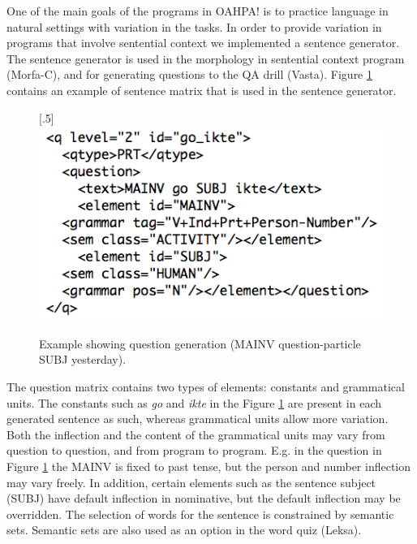 \documentclass[11pt]{article}
\begin{document}
One of the main goals of the programs in OAHPA! is to practice language in natural settings with variation in the tasks. In order to provide variation in programs that involve sentential context we implemented a sentence generator. The sentence generator is used in the morphology in sentential context program (Morfa-C), and for generating questions to the QA drill (Vasta). Figure \ref{questionv} contains an example of sentence matrix that is used in the sentence generator.

\begin{figure}[htbp]
\begin{center}
\scalebox{.5}[.5]{\includegraphics{presentation/img/question_vasta2.png}}\\
\caption{Example showing question generation (MAINV question-particle SUBJ yesterday).}
\label{questionv}
\end{center}
\end{figure}

The question matrix contains two types of elements: constants and grammatical units. The constants such as \textit{go} and \textit{ikte} in the Figure \ref{questionv} are present in each generated sentence as such, whereas grammatical units allow more variation. Both the inflection and the content of the grammatical units may vary from question to question, and from program to program. E.g. in the question in Figure \ref{questionv} the MAINV is fixed to past tense, but the person and number inflection may vary freely. In addition, certain elements such as the sentence subject (SUBJ) have default inflection in nominative, but the default inflection may be overridden. The selection of words for the sentence is constrained by semantic sets. Semantic sets are also used as an option in the word quiz (Leksa).
%
\end{document}
